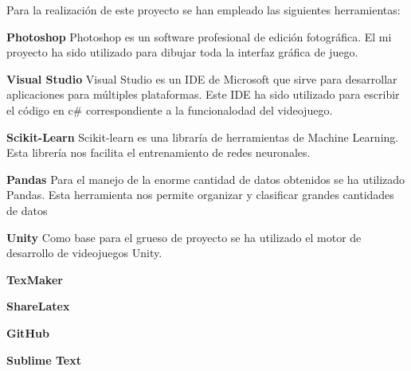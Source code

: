 
Para la realización de este proyecto se han empleado las siguientes herramientas:

\textbf{Photoshop}
Photoshop es un software profesional de edición fotográfica. El mi proyecto ha sido utilizado para dibujar toda la interfaz gráfica de juego.

\textbf{Visual Studio}
Visual Studio  es un IDE de Microsoft que sirve para desarrollar aplicaciones para múltiples plataformas. Este IDE ha sido utilizado para escribir el código en c# correspondiente a la funcionalodad del videojuego.

\textbf{Scikit-Learn}
Scikit-learn es una libraría de herramientas de Machine Learning. Esta librería nos facilita el entrenamiento de redes neuronales.

\textbf{Pandas}
Para el manejo de la enorme cantidad de datos obtenidos se ha utilizado Pandas. Esta herramienta nos permite organizar y clasificar grandes cantidades de datos 

\textbf{Unity}
Como base para el grueso de proyecto se ha utilizado el motor de desarrollo de videojuegos Unity.

\textbf{TexMaker} 

\textbf{ShareLatex}

\textbf{GitHub}

\textbf{Sublime Text}

